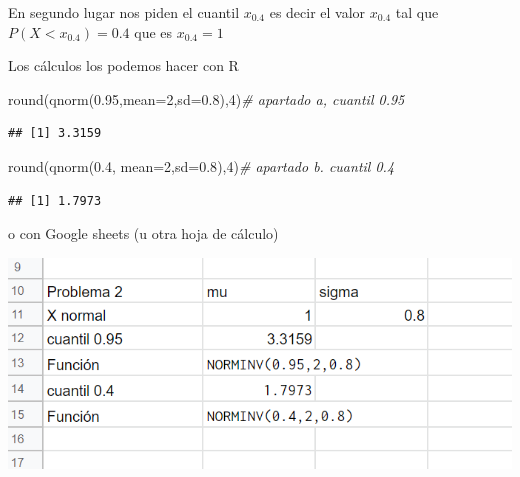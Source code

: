 \documentclass[
]{article}
\newenvironment{Shaded}{\begin{snugshade}}{\end{snugshade}}
\newcommand{\AttributeTok}[1]{\textcolor[rgb]{0.77,0.63,0.00}{#1}}
\newcommand{\CommentTok}[1]{\textcolor[rgb]{0.56,0.35,0.01}{\textit{#1}}}
\newcommand{\DecValTok}[1]{\textcolor[rgb]{0.00,0.00,0.81}{#1}}
\newcommand{\FloatTok}[1]{\textcolor[rgb]{0.00,0.00,0.81}{#1}}
\newcommand{\FunctionTok}[1]{\textcolor[rgb]{0.00,0.00,0.00}{#1}}
\newcommand{\NormalTok}[1]{#1}
\begin{document}
En segundo lugar nos piden el cuantil \(x_{0.4}\) es decir el valor
\(x_{0.4}\) tal que \(P(X <x_{0.4})=0.4\) que es \(x_{0.4}=1\)

Los cálculos los podemos hacer con R

\begin{Shaded}
\begin{Highlighting}[]
\FunctionTok{round}\NormalTok{(}\FunctionTok{qnorm}\NormalTok{(}\FloatTok{0.95}\NormalTok{,}\AttributeTok{mean=}\DecValTok{2}\NormalTok{,}\AttributeTok{sd=}\FloatTok{0.8}\NormalTok{),}\DecValTok{4}\NormalTok{)}\CommentTok{\# apartado a,  cuantil 0.95}
\end{Highlighting}
\end{Shaded}

\begin{verbatim}
## [1] 3.3159
\end{verbatim}

\begin{Shaded}
\begin{Highlighting}[]
\FunctionTok{round}\NormalTok{(}\FunctionTok{qnorm}\NormalTok{(}\FloatTok{0.4}\NormalTok{, }\AttributeTok{mean=}\DecValTok{2}\NormalTok{,}\AttributeTok{sd=}\FloatTok{0.8}\NormalTok{),}\DecValTok{4}\NormalTok{)}\CommentTok{\# apartado b.  cuantil 0.4}
\end{Highlighting}
\end{Shaded}

\begin{verbatim}
## [1] 1.7973
\end{verbatim}

o con Google sheets (u otra hoja de cálculo)

\includegraphics[width=9.46in]{pro2_cont_1}

\newpage
\end{document}
